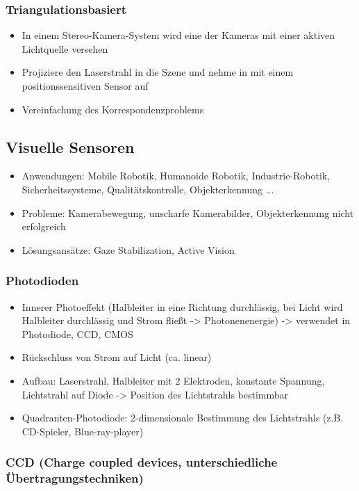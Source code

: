 \documentclass[paper=a4, fontsize=11pt]{scrartcl} %
\numberwithin{equation}{section} %
\numberwithin{figure}{section} %
\numberwithin{table}{section} %
\begin{document}
\subsubsection{Triangulationsbasiert}

\begin{itemize}
\item In einem Stereo-Kamera-System wird eine der Kameras mit einer aktiven Lichtquelle versehen
\item Projiziere den Laserstrahl in die Szene und nehme in mit einem positionssensitiven Sensor auf
\item Vereinfachung des Korrespondenzproblems
\end{itemize}

\subsection{Visuelle Sensoren}

\begin{itemize}
\item Anwendungen: Mobile Robotik, Humanoide Robotik, Industrie-Robotik, Sicherheitssysteme, Qualitätskontrolle, Objekterkennung ...
\item Probleme: Kamerabewegung, unscharfe Kamerabilder, Objekterkennung nicht erfolgreich 
\item Lösungsansätze: Gaze Stabilization, Active Vision
\end{itemize}

\subsubsection{Photodioden}

\begin{itemize}
\item Innerer Photoeffekt (Halbleiter in eine Richtung durchlässig, bei Licht wird Halbleiter durchlässig und Strom fließt -> Photonenenergie) -> verwendet in Photodiode, CCD, CMOS
\item Rückschluss von Strom auf Licht (ca. linear)
\item Aufbau: Laserstrahl, Halbleiter mit 2 Elektroden, konstante Spannung, Lichtstrahl auf Diode -> Position des Lichtstrahls bestimmbar
\item Quadranten-Photodiode: 2-dimensionale Bestimmung des Lichtstrahls (z.B. CD-Spieler, Blue-ray-player)
\end{itemize}

\subsubsection{CCD (Charge coupled devices, unterschiedliche Übertragungstechniken)}
\end{document}
